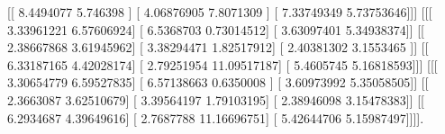 \documentclass{article}%
\begin{document}
  {[}{[} 8.4494077   5.746398  {]}\newline%
   {[} 4.06876905  7.8071309 {]}\newline%
   {[} 7.33749349  5.73753646{]}{]}{]}\newline%
\newline%
\newline%
 {[}{[}{[} 3.33961221  6.57606924{]}\newline%
   {[} 6.5368703   0.73014512{]}\newline%
   {[} 3.63097401  5.34938374{]}{]}\newline%
\newline%
  {[}{[} 2.38667868  3.61945962{]}\newline%
   {[} 3.38294471  1.82517912{]}\newline%
   {[} 2.40381302  3.1553465 {]}{]}\newline%
\newline%
  {[}{[} 6.33187165  4.42028174{]}\newline%
   {[} 2.79251954 11.09517187{]}\newline%
   {[} 5.4605745   5.16818593{]}{]}{]}\newline%
\newline%
\newline%
 {[}{[}{[} 3.30654779  6.59527835{]}\newline%
   {[} 6.57138663  0.6350008 {]}\newline%
   {[} 3.60973992  5.35058505{]}{]}\newline%
\newline%
  {[}{[} 2.3663087   3.62510679{]}\newline%
   {[} 3.39564197  1.79103195{]}\newline%
   {[} 2.38946098  3.15478383{]}{]}\newline%
\newline%
  {[}{[} 6.2934687   4.39649616{]}\newline%
   {[} 2.7687788  11.16696751{]}\newline%
   {[} 5.42644706  5.15987497{]}{]}{]}{]}.\newline%

%
\newpage%
\end{document}
